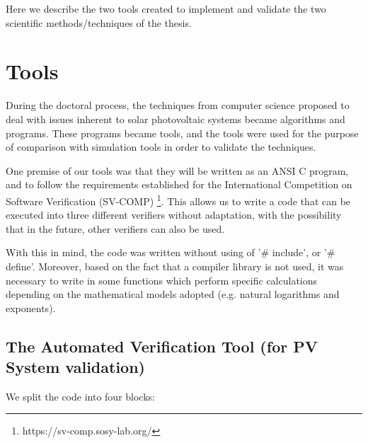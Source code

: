 Here we describe the two tools created to implement and validate the two scientific methods/techniques of the thesis.

\section{Tools}

During the doctoral process, the techniques from computer science proposed to deal with issues inherent to solar photovoltaic systems became algorithms and programs. These programs became tools, and the tools were used for the purpose of comparison with simulation tools in order to validate the techniques.

One premise of our tools was that they will be written as an ANSI C program, and to follow the requirements established for the International Competition on Software Verification (SV-COMP) \footnote{https://sv-comp.sosy-lab.org/}. This allows us to write a code that can be executed into three different verifiers without adaptation, with the possibility that in the future, other verifiers can also be used.
%

With this in mind, the code was written without using of '\# include', or '\# define'. Moreover, based on the fact that a compiler library is not used, it was necessary to write in some functions which perform specific calculations depending on the mathematical models adopted (e.g. natural logarithms and exponents).

\subsection{The Automated Verification Tool (for PV System validation)}
\label{sec:automatedverification}

We split the code into four blocks:

